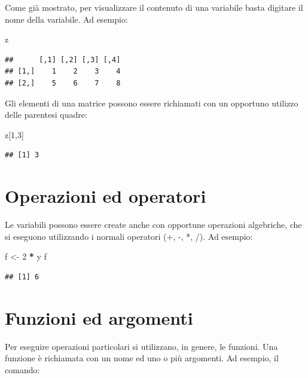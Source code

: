 \documentclass[a4paper,12pt,oneside]{book}
\newenvironment{Shaded}{\begin{snugshade}}{\end{snugshade}}
\newcommand{\DecValTok}[1]{\textcolor[rgb]{0.00,0.00,0.81}{#1}}
\newcommand{\StringTok}[1]{\textcolor[rgb]{0.31,0.60,0.02}{#1}}
\newcommand{\OperatorTok}[1]{\textcolor[rgb]{0.81,0.36,0.00}{\textbf{#1}}}
\newcommand{\NormalTok}[1]{#1}
\begin{document}
Come già mostrato, per visualizzare il contenuto di una variabile basta
digitare il nome della variabile. Ad esempio:

\begin{Shaded}
\begin{Highlighting}[]
\NormalTok{z}
\end{Highlighting}
\end{Shaded}

\begin{verbatim}
##      [,1] [,2] [,3] [,4]
## [1,]    1    2    3    4
## [2,]    5    6    7    8
\end{verbatim}

Gli elementi di una matrice possono essere richiamati con un opportuno
utilizzo delle parentesi quadre:

\begin{Shaded}
\begin{Highlighting}[]
\NormalTok{z[}\DecValTok{1}\NormalTok{,}\DecValTok{3}\NormalTok{]}
\end{Highlighting}
\end{Shaded}

\begin{verbatim}
## [1] 3
\end{verbatim}

\section{Operazioni ed operatori}\label{operazioni-ed-operatori}

Le variabili possono essere create anche con opportune operazioni
algebriche, che si eseguono utilizzando i normali operatori (+, -, *,
/). Ad esempio:

\begin{Shaded}
\begin{Highlighting}[]
\NormalTok{f  <-}\StringTok{  }\DecValTok{2} \OperatorTok{*}\StringTok{ }\NormalTok{y}
\NormalTok{f}
\end{Highlighting}
\end{Shaded}

\begin{verbatim}
## [1] 6
\end{verbatim}

\section{Funzioni ed argomenti}\label{funzioni-ed-argomenti}

Per eseguire operazioni particolari si utilizzano, in genere, le
funzioni. Una funzione è richiamata con un nome ed uno o più argomenti.
Ad esempio, il comando:
\end{document}
